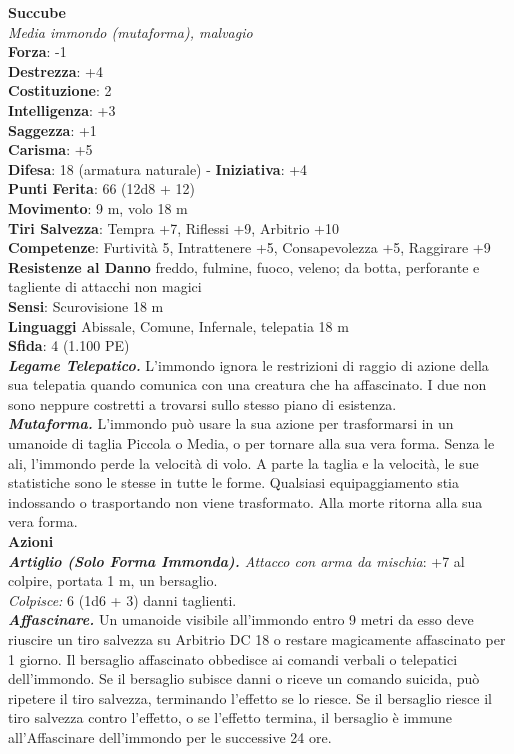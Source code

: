 \begin{multicols}{2}
\medskip\textbf{Succube}\\
\emph{Media immondo (mutaforma), malvagio}\\
\textbf{Forza}: -1\\
\textbf{Destrezza}: +4\\
\textbf{Costituzione}: 2\\
\textbf{Intelligenza}: +3\\
\textbf{Saggezza}: +1\\
\textbf{Carisma}: +5\\
\textbf{Difesa}: 18 (armatura naturale) - \textbf{Iniziativa}: +4\\
\textbf{Punti Ferita}: 66 (12d8 + 12)\\
\textbf{Movimento}: 9 m, volo 18 m\\
\textbf{Tiri Salvezza}: Tempra +7, Riflessi +9, Arbitrio +10\\
\textbf{Competenze}: Furtività 5, Intrattenere +5, Consapevolezza +5, Raggirare +9\\
\textbf{Resistenze al Danno} freddo, fulmine, fuoco, veleno; da botta, perforante e tagliente di attacchi non magici\\
\textbf{Sensi}: Scurovisione 18 m\\
\textbf{Linguaggi} Abissale, Comune, Infernale, telepatia 18 m \\
\textbf{Sfida}: 4 (1.100 PE)\smallskip\\
\emph{\textbf{Legame Telepatico.}} L'immondo ignora le restrizioni di raggio di azione della sua telepatia quando comunica con una creatura che ha affascinato. I due non sono neppure costretti a trovarsi sullo stesso piano di esistenza.\\
\emph{\textbf{Mutaforma.}} L'immondo può usare la sua azione per trasformarsi in un umanoide di taglia Piccola o Media, o per tornare alla sua vera forma. Senza le ali, l'immondo perde la velocità di volo. A parte la taglia e la velocità, le sue statistiche sono le stesse in tutte le forme. Qualsiasi equipaggiamento stia indossando o trasportando non viene trasformato. Alla morte ritorna alla sua vera forma. \\
\smallskip\textbf{Azioni}\\
\emph{\textbf{Artiglio (Solo Forma Immonda).} Attacco con arma da mischia}: +7 al colpire, portata 1 m, un bersaglio.\\
\emph{Colpisce:} 6 (1d6 + 3) danni taglienti.\\
\emph{\textbf{Affascinare.}} Un umanoide visibile all'immondo entro 9 metri da esso deve riuscire un tiro salvezza su Arbitrio DC  18 o restare magicamente affascinato per 1 giorno. Il bersaglio affascinato obbedisce ai comandi verbali o telepatici dell'immondo. Se il bersaglio subisce danni o riceve un comando suicida, può ripetere il tiro salvezza, terminando l'effetto se lo riesce. Se il bersaglio riesce il tiro salvezza contro l'effetto, o se l'effetto termina, il bersaglio è immune all'Affascinare dell'immondo per le successive 24 ore.\\

\end{multicols}
